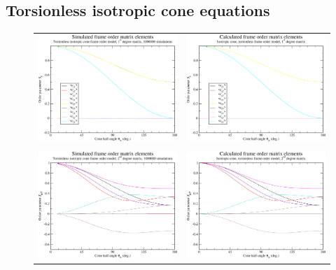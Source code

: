 \subsection{Torsionless isotropic cone equations}

\begin{figure}
\centering
  \begin{tabular}{@{}cc@{}}
    \includegraphics[width=.5\textwidth]{images/frame_order_matrix/Sij_iso_cone_torsionless_in_frame_theta_x_ens1000000.eps} &
    \includegraphics[width=.5\textwidth]{images/frame_order_matrix/Sij_iso_cone_torsionless_in_frame_theta_x_calc.eps} \\
    \\[-5pt]
    \includegraphics[width=.5\textwidth]{images/frame_order_matrix/Sijkl_iso_cone_torsionless_in_frame_theta_x_ens1000000.eps} &
    \includegraphics[width=.5\textwidth]{images/frame_order_matrix/Sijkl_iso_cone_torsionless_in_frame_theta_x_calc.eps} \\

\end{tabular}
\end{figure}
